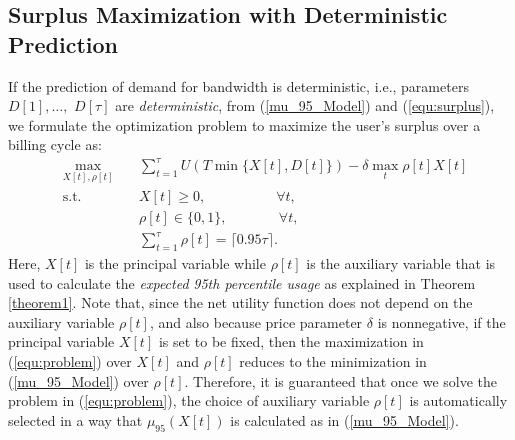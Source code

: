 \documentclass[10pt,journal,compsoc]{IEEEtran}
\begin{document}
\subsection{Surplus Maximization with Deterministic Prediction}\label{subsec:deter}
If the prediction of demand for bandwidth is deterministic, i.e., parameters $D[1], \ldots,$ $D[\tau]$ are \emph{deterministic}, from (\ref{mu_95_Model}) and (\ref{equ:surplus}), we formulate the optimization problem to maximize the user's  surplus over a billing cycle as:
\begin{equation}\label{equ:problem}
\begin{aligned}
& \underset{X[t],\rho[t]}{\text{max}} \!\!\!\!\!\!\
& &  \sum_{t=1}^{\tau} {U(T\min\{X[t],D[t]\})}-\delta \max_{t} \rho[t]X[t]\\
& \text{s.t.} & & X[t]\geq 0, \quad \quad \quad \quad \quad \forall t, \\
&&& \rho[t] \in \{0,1\}, \quad\quad\quad\ \ \:\! \forall t, \\
&&& \sum_{t=1}^{\tau} {\rho[t]}=\lceil0.95\tau\rceil.
\end{aligned}
\end{equation}
Here,
$X[t]$ is the principal variable while $\rho[t]$ is the auxiliary variable that is used to calculate the \emph{expected} \emph{95th percentile usage} as explained in Theorem \ref{theorem1}. Note that, since the net utility function does not depend on the auxiliary variable $\rho[t]$, and also because price parameter $\delta$ is nonnegative, if the principal variable $X[t]$ is set to be fixed, then the maximization in (\ref{equ:problem}) over $X[t]$ and $\rho[t]$ reduces to the minimization in (\ref{mu_95_Model}) over $\rho[t]$. Therefore, it is guaranteed that once we solve the problem in (\ref{equ:problem}), the choice of auxiliary variable $\rho[t]$ is automatically selected in a way that $\mu_{95}(X[t])$ is calculated as in (\ref{mu_95_Model}).
\end{document}
